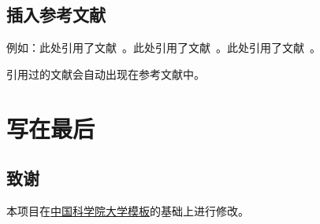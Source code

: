 \documentclass{CQMUReport}  %
\begin{document}
\subsection{插入参考文献}

例如：此处引用了文献~\cite{何清2014大数据下的机器学习算法综述}。此处引用了文献~\cite{刘志勇2019人工智能在法医学中的应用与展望}。此处引用了文献~\cite{任昕昕2026人工智能在法医毒物学中的应用与展望}。

\par 引用过的文献会自动出现在参考文献中。

\section{写在最后}

\subsection{致谢}

本项目在\href{https://github.com/jweihe/UCAS_Latex_Template}{中国科学院大学模板}的基础上进行修改。


\newpage


\end{document}

